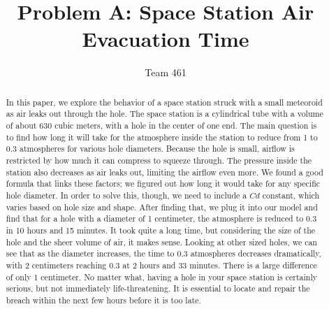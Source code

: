\documentclass{article}
\title{Problem A: Space Station Air Evacuation Time}
\author{Team 461}
\date{}
\begin{document}
\maketitle


\begin{abstract}
In this paper, we explore the behavior of a space station struck with a small meteoroid as air leaks out through the hole. The space station is a cylindrical tube with a volume of about 630 cubic meters, with a hole in the center of one end. The main question is to find how long it will take for the atmosphere inside the station to reduce from 1 to 0.3 atmospheres for various hole diameters. Because the hole is small, airflow is restricted by how much it can compress to squeeze through. The pressure inside the station also decreases as air leaks out, limiting the airflow even more. We found a good formula that links these factors; we figured out how long it would take for any specific hole diameter. In order to solve this, though, we need to include a $Cd$ constant, which varies based on hole size and shape. After finding that, we plug it into our model and find that for a hole with a diameter of 1 centimeter, the atmosphere is reduced to 0.3 in 10 hours and 15 minutes. It took quite a long time, but considering the size of the hole and the sheer volume of air, it makes sense. Looking at other sized holes, we can see that as the diameter increases, the time to 0.3 atmospheres decreases dramatically, with 2 centimeters reaching 0.3 at 2 hours and 33 minutes. There is a large difference of only 1 centimeter. No matter what, having a hole in your space station is certainly serious, but not immediately life-threatening. It is essential to locate and repair the breach within the next few hours before it is too late.
\end{abstract}

\newpage




\end{document}

